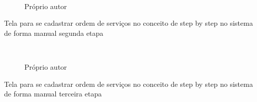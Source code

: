 \begin{figure}[H]
		\caption{\label{step_1}Próprio autor}
	\centering
	\mbox{%
		\qquad
	}
	
\end{figure}
\newpage

Tela para se cadastrar ordem de serviços no conceito de  step by step no sistema de forma manual segunda etapa

\begin{figure}[H]
		\caption{\label{step_2}Próprio autor}
	\centering
	\mbox{%
		\qquad
	}
	
\end{figure}
\newpage

Tela para se cadastrar ordem de serviços no conceito de  step by step no sistema de forma manual terceira etapa


